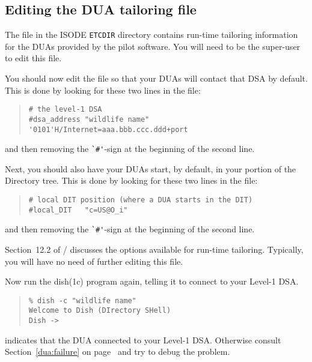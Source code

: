 \subsection	{Editing the DUA tailoring file}
The file  in the ISODE \verb"ETCDIR" directory contains
run-time tailoring information for the DUAs provided by the pilot software.
You will need to be the super-user to edit this file.

You should now edit the  file so that your DUAs
will contact that DSA by default.
This is done by looking for these two lines in the  file:
\begin{quote}\smaller\begin{verbatim}
# the level-1 DSA
#dsa_address "wildlife name"      '0101'H/Internet=aaa.bbb.ccc.ddd+port
\end{verbatim}\end{quote}
and then removing the \verb"`#'"-sign at the beginning of the second line.

Next,
you should also have your DUAs start, by default, in your portion of the
Directory tree.
This is done by looking for these two lines in the  file:
\begin{quote}\small\begin{verbatim}
# local DIT position (where a DUA starts in the DIT)
#local_DIT   "c=US@O_i"
\end{verbatim}\end{quote}
and then removing the \verb"`#'"-sign at the beginning of the second line.

Section~12.2 of \volfive/ discusses the options available for run-time
tailoring.
Typically,
you will have no need of further editing this file.

Now run the \man dish(1c) program again,
telling it to connect to your Level-1 DSA.
\begin{quote}\small\begin{verbatim}
% dish -c "wildlife name"
Welcome to Dish (DIrectory SHell)
Dish ->
\end{verbatim}\end{quote}
indicates that the DUA connected to your Level-1 DSA.
Otherwise consult Section~\ref{dua:failure} on
page~\pageref{dua:failure} and try to debug the problem.

